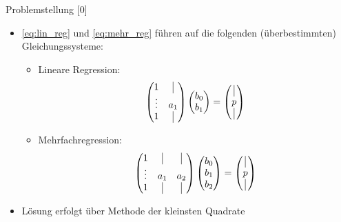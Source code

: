 \documentclass{beamer}
\begin{document}
\begin{frame}{Problemstellung [0]}
	\begin{itemize}
		\item \eqref{eq:lin_reg} und \eqref{eq:mehr_reg} führen auf die folgenden (überbestimmten) Gleichungssysteme:
		\begin{itemize}
			\item Lineare Regression:
			\begin{align}
			\begin{pmatrix}
			1 & \vrule \\
			\vdots & a_1\\
			1 & \vrule
			\end{pmatrix}
			\begin{pmatrix}
			b_0\\
			b_1
			\end{pmatrix}
			=
			\begin{pmatrix}
			\vrule\\
			p\\
			\vrule
			\end{pmatrix}
			\end{align}
			\item Mehrfachregression:
			\begin{align}
			\begin{pmatrix}
			1 & \vrule & \vrule\\
			\vdots & a_1&a_2\\
			1 & \vrule &\vrule
			\end{pmatrix}
			\begin{pmatrix}
			b_0\\
			b_1\\
			b_2
			\end{pmatrix}
			=
			\begin{pmatrix}
			\vrule\\
			p\\
			\vrule
			\end{pmatrix}
			\end{align}
		\pause
		\end{itemize}
		\item Lösung erfolgt über Methode der kleinsten Quadrate
	\end{itemize}
\end{frame}
\end{document}
